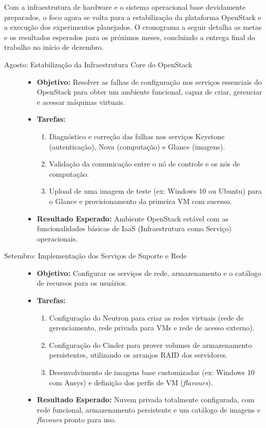 Com a infraestrutura de hardware e o sistema operacional base devidamente preparados, o foco agora se volta para a estabilização da plataforma OpenStack e a execução dos experimentos planejados. O cronograma a seguir detalha as metas e os resultados esperados para os próximos meses, concluindo a entrega final do trabalho no início de dezembro.

\begin{description}
    \item[Agosto: Estabilização da Infraestrutura Core do OpenStack]
    \begin{itemize}
        \item \textbf{Objetivo:} Resolver as falhas de configuração nos serviços essenciais do OpenStack para obter um ambiente funcional, capaz de criar, gerenciar e acessar máquinas virtuais.
        \item \textbf{Tarefas:}
        \begin{enumerate}
            \item Diagnóstico e correção das falhas nos serviços Keystone (autenticação), Nova (computação) e Glance (imagens).
            \item Validação da comunicação entre o nó de controle e os nós de computação.
            \item Upload de uma imagem de teste (ex: Windows 10 ou Ubuntu) para o Glance e provisionamento da primeira VM com sucesso.
        \end{enumerate}
        \item \textbf{Resultado Esperado:} Ambiente OpenStack estável com as funcionalidades básicas de IaaS (Infraestrutura como Serviço) operacionais.
    \end{itemize}

    \item[Setembro: Implementação dos Serviços de Suporte e Rede]
    \begin{itemize}
        \item \textbf{Objetivo:} Configurar os serviços de rede, armazenamento e o catálogo de recursos para os usuários.
        \item \textbf{Tarefas:}
        \begin{enumerate}
            \item Configuração do Neutron para criar as redes virtuais (rede de gerenciamento, rede privada para VMs e rede de acesso externo).
            \item Configuração do Cinder para prover volumes de armazenamento persistentes, utilizando os arranjos RAID dos servidores.
            \item Desenvolvimento de imagens base customizadas (ex: Windows 10 com Ansys) e definição dos perfis de VM (\textit{flavours}).
        \end{enumerate}
        \item \textbf{Resultado Esperado:} Nuvem privada totalmente configurada, com rede funcional, armazenamento persistente e um catálogo de imagens e \textit{flavours} pronto para uso.
    \end{itemize}


\end{description}
